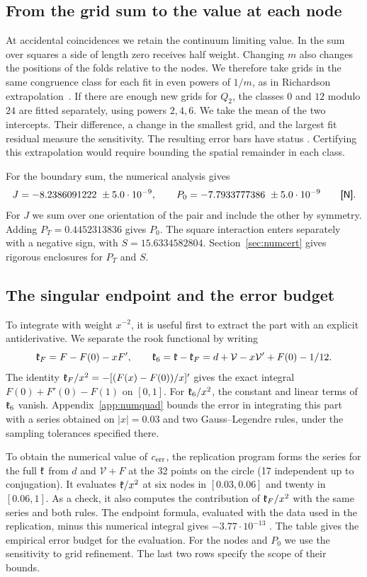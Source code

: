 \subsection{From the grid sum to the value at each node}\label{sec:extrapolacion}
At accidental coincidences we retain the continuum limiting value. In the sum over squares a side of
length zero receives half weight. Changing $m$ also changes the positions of the folds relative to the
nodes. We therefore take grids in the same congruence class for each fit in even powers of $1/m$, as in
Richardson extrapolation~\cite{richardson}. If there are enough new grids for $Q_2$, the classes $0$ and
$12$ modulo $24$ are fitted separately, using powers $2,4,6$. We take the mean of the two intercepts.
Their difference, a change in the smallest grid, and the largest fit residual measure the sensitivity.
The resulting error bars have status . Certifying this extrapolation would require bounding the
spatial remainder in each class.

For the boundary sum, the numerical analysis gives
\[
 J=-8.2386091222\ \pm5.0\cdot10^{-9},\qquad
 P_0=-7.7933777386\ \pm5.0\cdot10^{-9}\qquad\text{\textnormal{\textsf{[N]}}}.
\]
For $J$ we sum over one orientation of the pair and include the other by symmetry. Adding
$P_T=0.4452313836$ gives $P_0$. The square interaction enters separately with a negative sign, with
$S=15.6334582804$. Section~\ref{sec:numcert} gives rigorous enclosures for $P_T$ and $S$.

\subsection{The singular endpoint and the error budget}\label{sec:presupuesto}
To integrate with weight $x^{-2}$, it is useful first to extract the part with an explicit
antiderivative. We separate the rook functional by writing
\[
 \mathfrak{k}_F=F-F(0)-xF',\qquad
 \mathfrak{k}_6=\mathfrak{k}-\mathfrak{k}_F=d+\mathcal V-x\mathcal V'+F(0)-1/12.
\]
The identity $\mathfrak{k}_F/x^2=-[(F(x)-F(0))/x]'$ gives the exact integral $F(0)+F'(0)-F(1)$ on $[0,1]$. For
$\mathfrak{k}_6/x^2$, the constant and linear terms of $\mathfrak{k}_6$ vanish. Appendix~\ref{app:numquad} bounds
the error in integrating this part with a series obtained on $|x|=0.03$ and two Gauss--Legendre rules,
under the sampling tolerances specified there.

To obtain the numerical value of $c_{\mathrm{err}}$, the replication program forms the series for the full $\mathfrak{k}$
from $d$ and $\mathcal V+F$ at the 32 points on the circle (17 independent up to conjugation). It
evaluates $\mathfrak{k}/x^2$ at six nodes in $[0.03,0.06]$ and twenty in $[0.06,1]$. As a check, it also
computes the contribution of $\mathfrak{k}_F/x^2$ with the same series and both rules. The endpoint formula,
evaluated with the data used in the replication, minus this numerical integral gives $-3.77\cdot10^{-13}$
. The table gives the empirical error budget  for the evaluation. For the nodes and
$P_0$ we use
the sensitivity to grid refinement. The last two rows specify the scope of their bounds.

